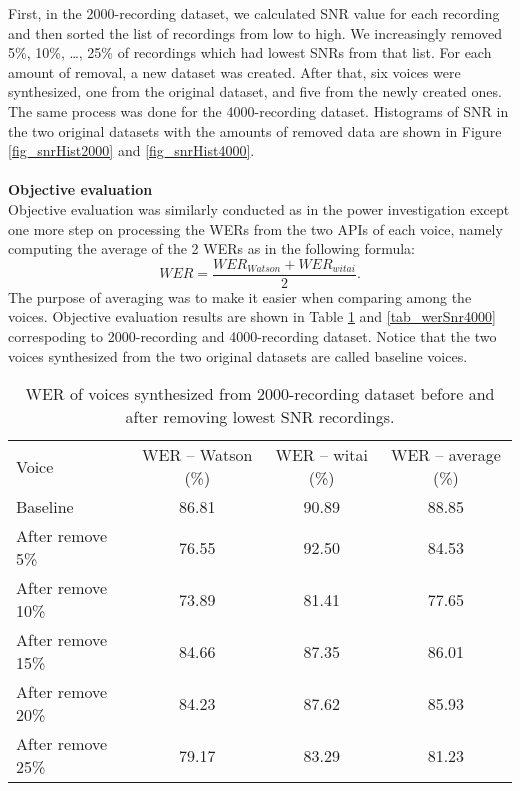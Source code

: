 \documentclass[12pt]{article}
\begin{document}
First, in the 2000-recording dataset, we calculated SNR value for each recording and then sorted the list of recordings from low to high. We increasingly removed 5\%, 10\%, …, 25\% of recordings which had lowest SNRs from that list. For each amount of removal, a new dataset was created. After that, six voices were synthesized, one from the original dataset, and five from the newly created ones. The same process was done for the 4000-recording dataset. Histograms of SNR in the two original datasets with the amounts of removed data are shown in Figure \ref{fig_snrHist2000} and \ref{fig_snrHist4000}.\\\\
\textbf{Objective evaluation}
\vspace{0.28cm}\\
Objective evaluation was similarly conducted as in the power investigation except one more step on processing the WERs from the two APIs of each voice, namely computing the average of the 2 WERs as in the following formula:
\begin{equation}\label{exp_averageWer}
    WER = \frac{WER_{Watson} + WER_{witai}}{2}.
\end{equation}
The purpose of averaging was to make it easier when comparing among the voices. Objective evaluation results are shown in Table \ref{tab_werSnr2000} and \ref{tab_werSnr4000} correspoding to 2000-recording and 4000-recording dataset. Notice that the two voices synthesized from the two original datasets are called baseline voices.

\begin{table}[]
\begin{center}
\caption{WER of voices synthesized from 2000-recording dataset before and after removing lowest SNR recordings.}
\label{tab_werSnr2000}
\vspace{3mm}
\begin{tabular}{lccc}
\hline
Voice & WER – Watson (\%) & WER – witai (\%) & WER – average (\%)\\
\cmidrule(l{0pt}r{2pt}){1-1}\cmidrule(l{0pt}r{2pt}){2-2}\cmidrule(l{0pt}r{2pt}){3-3}\cmidrule(l{0pt}r{2pt}){4-4}
Baseline          & 86.81 & 90.89 & 88.85 \\
After remove 5\%  & 76.55 &	92.50 & 84.53 \\
After remove 10\% & 73.89 & 81.41 & 77.65 \\
After remove 15\% & 84.66 & 87.35 & 86.01 \\
After remove 20\% & 84.23 & 87.62 & 85.93 \\
After remove 25\% & 79.17 & 83.29 & 81.23 \\
\hline
\end{tabular}
\end{center}
\end{table}
\end{document}

